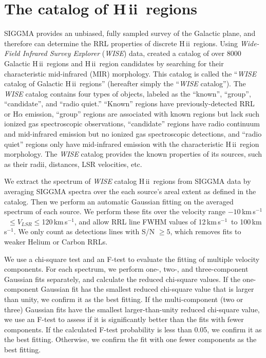 \documentclass[manuscript]{aastex61}
\newcommand{\hii}{{\rm H\,}{{\sc ii}}}
\newcommand{\kms}{\,km\,s$^{-1}$}
\begin{document}
\section{The catalog of \hii\ regions} \label{sec_cata}

SIGGMA provides an unbiased, fully sampled survey of the Galactic plane, and therefore can determine the RRL properties of discrete \hii\ regions.
Using {\it Wide-Field Infrared Survey Explorer} ({\it WISE}) data, \citet{Anderson2014} created a catalog of over 8000 Galactic \hii\ regions and \hii\ region candidates by searching for their characteristic mid-infrared (MIR) morphology.  This catalog is called the ``{\it WISE} catalog of Galactic \hii\ regions'' (hereafter simply the ``{\it WISE} catalog'').
The {\it WISE} catalog contains four types of objects, labeled as the ``known'', ``group'', ``candidate'', and ``radio quiet.''
``Known'' regions have previously-detected RRL or H$\alpha$ emission, ``group'' regions are associated with known regions but lack such ionized gas spectroscopic observations, ``candidate'' regions have radio continuum and mid-infrared emission but no ionized gas spectroscopic detections, and ``radio quiet'' regions only have mid-infrared emission with the characteristic \hii\ region morphology.
The {\it WISE} catalog provides the known properties of its sources, such as their radii, distances, LSR velocities, etc.

We extract the spectrum of {\it WISE} catalog \hii\ regions from SIGGMA data by averaging SIGGMA spectra over the each source's areal extent as defined in the catalog.
Then we perform an automatic Gaussian fitting on the averaged spectrum of each source. 
We perform these fits over the velocity range $-10$\kms\ $\leq V_{LSR} \leq $120\kms, and allow RRL line FWHM values of 12\kms\ to 100\kms.  We only count as detections lines with S/N $\geq 5$, which removes fits to weaker Helium or Carbon RRLs.

We use a chi-square test and an F-test to evaluate the fitting of multiple velocity components.
For each spectrum, we perform one-, two-, and three-component Gaussian fits separately, and calculate the reduced chi-square values.
If the one-component Gaussian fit has the smallest reduced chi-square value that is larger than unity, we confirm it as the best fitting.
If the multi-component (two or three) Gaussian fits have the smallest larger-than-unity reduced chi-square value, we use an F-test to assess if it is significantly better than the fits with fewer components.
If the calculated F-test probability is less than 0.05, we confirm it as the best fitting.
Otherwise, we confirm the fit with one fewer components as the best fitting.
\end{document}
